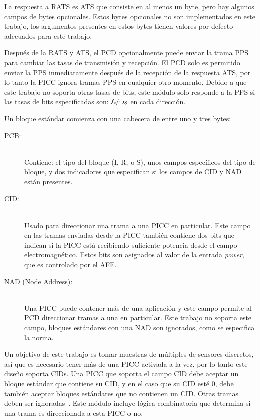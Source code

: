 \documentclass[a4paper, twoside, 11pt]{report}
\begin{document}
La respuesta a RATS es ATS que consiste en al menos un byte, pero hay algunos campos de bytes opcionales. Estos bytes opcionales no son implementados en este trabajo, los argumentos presentes en estos bytes tienen valores por defecto adecuados para este trabajo.

Después de la RATS y ATS, el PCD opcionalmente puede enviar la trama PPS para cambiar las tasas de transmisión y recepción. El PCD solo es permitido enviar la PPS inmediatamente después de la recepción de la respuesta ATS, por lo tanto la PICC ignora tramas PPS en cualquier otro momento. Debido a que este trabajo no soporta otras tasas de bits, este módulo solo responde a la PPS si las tasas de bits especificadas son: $\nicefrac{f_c}{128}$ en cada dirección.

Un bloque estándar comienza con una cabecera de entre uno y tres bytes:

\begin{description}
  \item[PCB:] \hfill \\ Contiene: el tipo del bloque (I, R, o S), unos campos específicos del tipo de bloque, y dos indicadores que especifican si los campos de CID y NAD están presentes.
  \item[CID:] \hfill \\ Usado para direccionar una trama a una PICC en particular. Este campo en las tramas enviadas desde la PICC también contiene dos bits que indican si la PICC está recibiendo suficiente potencia desde el campo electromagnético. Estos bits son asignados al valor de la entrada \textit{power}, que es controlado por el AFE.
  \item[NAD (Node Address):] \hfill \\ Una PICC puede contener más de una aplicación y este campo permite al PCD direccionar tramas a una en particular. Este trabajo no soporta este campo, bloques estándares con una NAD son ignorados, como se especifica la norma.
\end{description}

Un objetivo de este trabajo es tomar muestras de múltiples de sensores discretos, así que es necesario tener más de una PICC activada a la vez, por lo tanto este diseño soporta CIDs. Una PICC que soporta el campo CID debe aceptar un bloque estándar que contiene su CID, y en el caso que su CID esté 0, debe también aceptar bloques estándares que no contienen un CID. Otras tramas deben ser ignoradas~\cite{iso14443-4}. Este módulo incluye lógica combinatoria que determina si una trama es direccionada a esta PICC o no.
\end{document}
